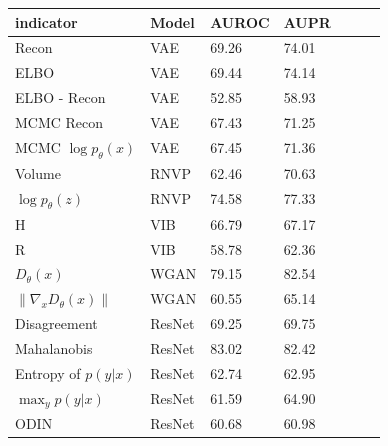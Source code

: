 \documentclass[letterpaper]{article} %
\begin{document}
\begin{table}[t]
\centering
\begin{tabular}{lllllll}
indicator     & Model & AUROC & AUPR  \\
\toprule
Recon & VAE & 69.26 & 74.01 \\
ELBO & VAE & 69.44 & 74.14 \\
ELBO - Recon & VAE & 52.85 & 58.93 \\
MCMC Recon & VAE & 67.43 & 71.25 \\
MCMC $\log p_\theta(x)$ & VAE & 67.45 & 71.36 \\
Volume & RNVP & 62.46 & 70.63 \\
$\log p_\theta(z)$ & RNVP & 74.58 & 77.33 \\
H & VIB & 66.79 & 67.17 \\
R & VIB & 58.78 & 62.36 \\
$D_\theta(x)$ & WGAN & 79.15 & 82.54 \\
$\|\nabla_x D_\theta(x)\|$ & WGAN & 60.55 & 65.14 \\
Disagreement & ResNet & 69.25 & 69.75\\
Mahalanobis & ResNet & 83.02 & 82.42 \\
Entropy of $p(y|x)$ & ResNet & 62.74 & 62.95 \\
$\max_{y} p(y|x)$ & ResNet & 61.59 & 64.90 \\
ODIN & ResNet & 60.68 & 60.98\\

\end{tabular}
\end{table}
\end{document}
